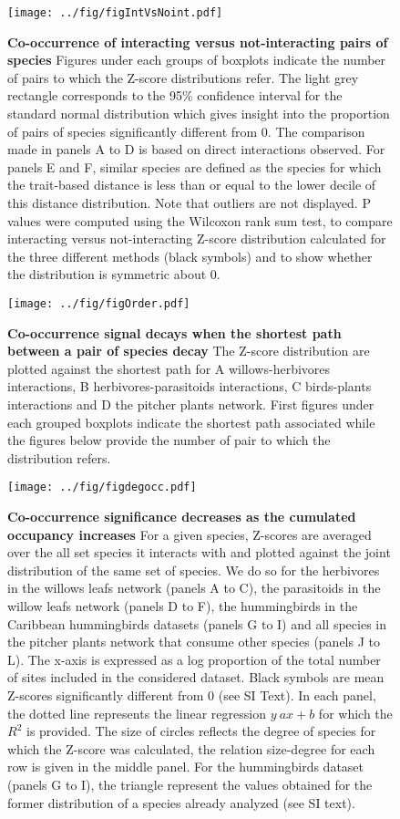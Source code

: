 \newpage

\begin{figure}[htbp]
\centering
\texttt{[image: ../fig/figIntVsNoint.pdf]}
\caption{\textbf{Co-occurrence of interacting versus not-interacting
pairs of species} Figures under each groups of boxplots indicate the
number of pairs to which the Z-score distributions refer. The light grey
rectangle corresponds to the 95\% confidence interval for the standard
normal distribution which gives insight into the proportion of pairs of
species significantly different from 0. The comparison made in panels A
to D is based on direct interactions observed. For panels E and F,
similar species are defined as the species for which the trait-based
distance is less than or equal to the lower decile of this distance
distribution. Note that outliers are not displayed. P values were
computed using the Wilcoxon rank sum test, to compare interacting versus
not-interacting Z-score distribution calculated for the three different
methods (black symbols) and to show whether the distribution is
symmetric about 0.\label{fig:synth}}
\end{figure}

\newpage

\begin{figure}[htbp]
\centering
\texttt{[image: ../fig/figOrder.pdf]}
\caption{\textbf{Co-occurrence signal decays when the shortest path
between a pair of species decay } The Z-score distribution are plotted
against the shortest path for A willows-herbivores interactions, B
herbivores-parasitoids interactions, C birds-plants interactions and D
the pitcher plants network. First figures under each grouped boxplots
indicate the shortest path associated while the figures below provide
the number of pair to which the distribution refers.\label{fig:shtpth}}
\end{figure}

\newpage

\begin{figure}[htbp]
\centering
\texttt{[image: ../fig/figdegocc.pdf]}
\caption{\textbf{Co-occurrence significance decreases as the cumulated
occupancy increases} For a given species, Z-scores are averaged over the
all set species it interacts with and plotted against the joint
distribution of the same set of species. We do so for the herbivores in
the willows leafs network (panels A to C), the parasitoids in the willow
leafs network (panels D to F), the hummingbirds in the Caribbean
hummingbirds datasets (panels G to I) and all species in the pitcher
plants network that consume other species (panels J to L). The x-axis is
expressed as a log proportion of the total number of sites included in
the considered dataset. Black symbols are mean Z-scores significantly
different from 0 (see SI Text). In each panel, the dotted line
represents the linear regression \(y~ax+b\) for which the \(R^2\) is
provided. The size of circles reflects the degree of species for which
the Z-score was calculated, the relation size-degree for each row is
given in the middle panel. For the hummingbirds dataset (panels G to I),
the triangle represent the values obtained for the former distribution
of a species already analyzed (see SI text).\label{fig:degocc}}
\end{figure}

